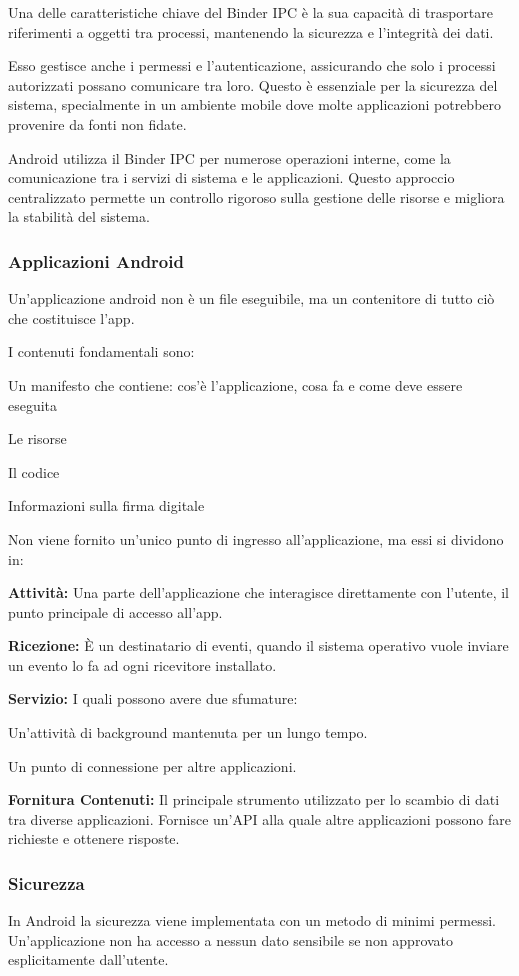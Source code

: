 \spacer
Una delle caratteristiche chiave del Binder IPC è la sua capacità di trasportare riferimenti a oggetti tra processi, mantenendo la sicurezza e l'integrità dei dati.

\spacer
Esso gestisce anche i permessi e l'autenticazione, assicurando che solo i processi autorizzati possano comunicare tra loro. Questo è essenziale per la sicurezza del sistema, specialmente in un ambiente mobile dove molte applicazioni potrebbero provenire da fonti non fidate.

\spacer
Android utilizza il Binder IPC per numerose operazioni interne, come la comunicazione tra i servizi di sistema e le applicazioni. Questo approccio centralizzato permette un controllo rigoroso sulla gestione delle risorse e migliora la stabilità del sistema.

\subsubsection{Applicazioni Android}
Un'applicazione android non è un file eseguibile, ma un contenitore di tutto ciò che costituisce l'app.

I contenuti fondamentali sono:
\begin{sitemize}
    \item Un manifesto che contiene: cos'è l'applicazione, cosa fa e come deve essere eseguita
    \item Le risorse
    \item Il codice
    \item Informazioni sulla firma digitale
\end{sitemize}

\spacer
Non viene fornito un'unico punto di ingresso all'applicazione, ma essi si dividono in:
\begin{sitemize}
    \item \textbf{Attività:} Una parte dell'applicazione che interagisce direttamente con l'utente, il punto principale di accesso all'app.
    \item \textbf{Ricezione:} È un destinatario di eventi, quando il sistema operativo vuole inviare un evento lo fa ad ogni ricevitore installato.
    \item \textbf{Servizio:} I quali possono avere due sfumature:
    \begin{sitemize}
        \item Un'attività di background mantenuta per un lungo tempo.
        \item Un punto di connessione per altre applicazioni.
    \end{sitemize}
    \item \textbf{Fornitura Contenuti:} Il principale strumento utilizzato per lo scambio di dati tra diverse applicazioni. Fornisce un'API alla quale altre applicazioni possono fare richieste e ottenere risposte.
\end{sitemize}

\subsubsection{Sicurezza}
In Android la sicurezza viene implementata con un metodo di minimi permessi. Un'applicazione non ha accesso a nessun dato sensibile se non approvato esplicitamente dall'utente.
